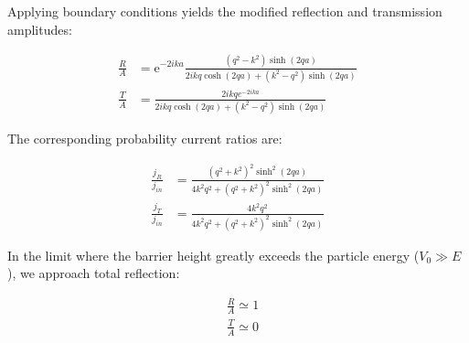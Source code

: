 Applying boundary conditions yields the modified reflection and transmission amplitudes:

\begin{align}
\frac{R}{A} & =\mathrm{e}^{-2 i k a} \frac{\left(q^{2}-k^{2}\right) \sinh (2 q a)}{2 i k q \cosh (2 q a)+\left(k^{2}-q^{2}\right) \sinh (2 q a)} \\
\frac{T}{A} & =\frac{2 i k q e^{-2 i k a}}{2 i k q \cosh (2 q a)+\left(k^{2}-q^{2}\right) \sinh (2 q a)}
\end{align}

The corresponding probability current ratios are:

\begin{align}
\frac{j_{R}}{j_{i n}} & =\frac{\left(q^{2}+k^{2}\right)^{2} \sinh ^{2}(2 q a)}{4 k^{2} q^{2}+\left(q^{2}+k^{2}\right)^{2} \sinh ^{2}(2 q a)}  \\
\frac{j_{T}}{j_{i n}} & =\frac{4 k^{2} q^{2}}{4 k^{2} q^{2}+\left(q^{2}+k^{2}\right)^{2} \sinh ^{2}(2 q a)}
\end{align}

In the limit where the barrier height greatly exceeds the particle energy ($V_0 \gg E$), we approach total reflection:

\begin{align}
& \frac{R}{A} \simeq 1  \\
& \frac{T}{A} \simeq 0
\end{align}
